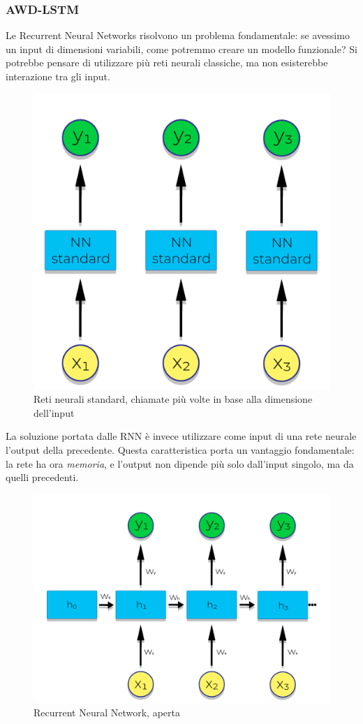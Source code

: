\subsubsection{AWD-LSTM}
Le Recurrent Neural Networks risolvono un problema fondamentale: se avessimo un input di dimensioni variabili, come potremmo creare un modello funzionale? Si potrebbe pensare di utilizzare più reti neurali classiche, ma non esisterebbe interazione tra gli input.
\begin{figure}[H]
    \begin{center}
        \includegraphics[width=0.5\columnwidth]{images/fallback/multiply-called-NN.jpg}
    \end{center}
    \caption{Reti neurali standard, chiamate più volte in base alla dimensione dell'input}
    \label{fig:multiply-called-NN}
\end{figure}
La soluzione portata dalle RNN è invece utilizzare come input di una rete neurale l'output della precedente. Questa caratteristica porta un vantaggio fondamentale: la rete ha ora \textit{memoria}, e l'output non dipende più solo dall'input singolo, ma da quelli precedenti.
\begin{figure}[H]
    \begin{center}
        \includegraphics[width=0.5\columnwidth]{images/fallback/unfolded-RNN.jpg}
    \end{center}
    \caption{Recurrent Neural Network, aperta}
    \label{fig:unfolded-RNN}
\end{figure}
